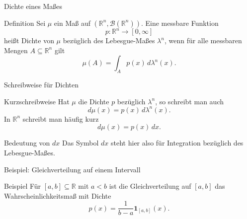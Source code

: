 \documentclass{beamer}
\begin{document}
\begin{frame}{Dichte eines Maßes}
\begin{block}{Definition}
Sei \(\mu\) ein Maß auf \((\mathbb R^n,\mathcal B(\mathbb R^n))\).
Eine messbare Funktion
\[
p\colon \mathbb R^n\to[0,\infty]
\]
heißt Dichte von \(\mu\) bezüglich des Lebesgue-Maßes \(\lambda^n\), wenn für alle messbaren Mengen \(A\subseteq\mathbb R^n\) gilt
\[
\mu(A)=\int_A p(x)\,d\lambda^n(x).
\]
\end{block}
\end{frame}

\begin{frame}{Schreibweise für Dichten}
\begin{block}{Kurzschreibweise}
Hat \(\mu\) die Dichte \(p\) bezüglich \(\lambda^n\), so schreibt man auch
\[
d\mu(x)=p(x)\,d\lambda^n(x).
\]
In \(\mathbb R^n\) schreibt man häufig kurz
\[
d\mu(x)=p(x)\,dx.
\]
\end{block}

\begin{block}{Bedeutung von \(dx\)}
Das Symbol \(dx\) steht hier also für Integration bezüglich des Lebesgue-Maßes.
\end{block}
\end{frame}
\begin{frame}{Beispiel: Gleichverteilung auf einem Intervall}
\begin{block}{Beispiel}
Für \([a,b]\subseteq\mathbb R\) mit \(a<b\) ist die Gleichverteilung auf \([a,b]\)
das Wahrscheinlichkeitsmaß mit Dichte
\[
p(x)=\frac1{b-a}\mathbf 1_{[a,b]}(x).
\]
\end{block}


\end{frame}


\end{document}
